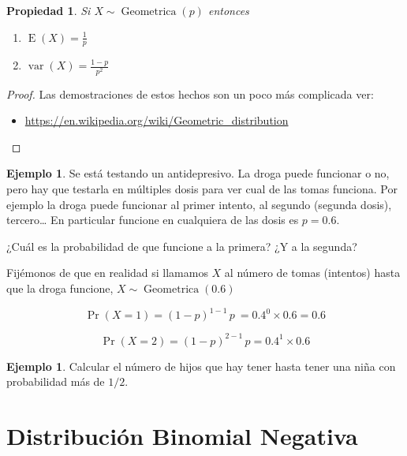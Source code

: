 \documentclass[]{book}
\providecommand{\tightlist}{%
  \setlength{\itemsep}{0pt}\setlength{\parskip}{0pt}}
\theoremstyle{plain}
\newtheorem{property}[theorem]{Propiedad}
\theoremstyle{definition}
\newtheorem{example}[theorem]{Ejemplo}
\theoremstyle{definition} %
\begin{document}
\begin{property}
  Si \(X\sim \operatorname {Geometrica} (p)\) entonces
\begin{enumerate}
  \item $\operatorname {E} (X)={\frac {1}{p}}$
  \item $\operatorname {var} (X)={\frac {1-p}{p^{2}}}$
\end{enumerate}
\end{property}


\begin{proof}
  Las demostraciones de estos hechos son un poco más complicada ver:

\begin{itemize}
\tightlist
\item
  \url{https://en.wikipedia.org/wiki/Geometric_distribution}
\end{itemize}
\end{proof}


\begin{example}
   
Se está testando un antidepresivo. La droga puede funcionar o no, pero
hay que testarla en múltiples dosis para ver cual de las tomas funciona.
Por ejemplo la droga puede funcionar al primer intento, al segundo
(segunda dosis), tercero\ldots{} En particular funcione en cualquiera de
las dosis es \(p=0.6\).

¿Cuál es la probabilidad de que funcione a la primera? ¿Y a la segunda?

Fijémonos de que en realidad si llamamos \(X\) al número de tomas
(intentos) hasta que la droga funcione,
\(\displaystyle X\sim \operatorname {Geometrica} (0.6)\)


\[\displaystyle \Pr(X=1)=(1-p)^{1-1}\,p\ =0.4^{0}\times 0.6=0.6\]

\[\displaystyle \Pr(X=2)=(1-p)^{2-1}\,p=0.4^{1}\times 0.6\]
\end{example}

\begin{example} 
Calcular el número de hijos que hay tener hasta tener una niña con
probabilidad más de \(1/2\).
\end{example}



 \section{Distribución Binomial
Negativa} 
\end{document}
